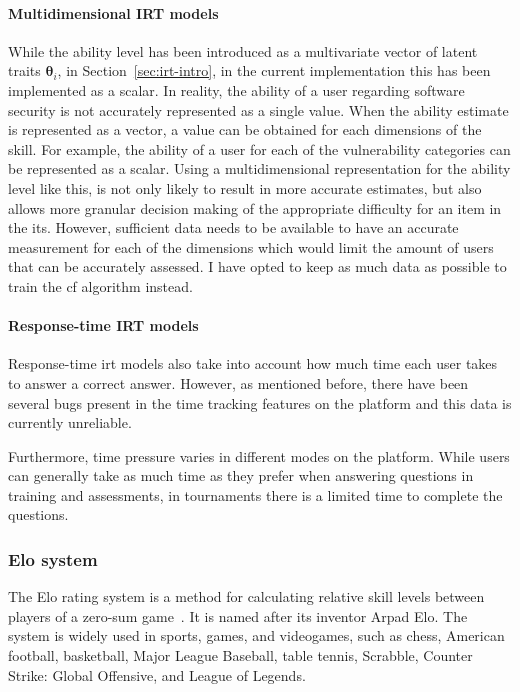 \paragraph{Multidimensional IRT models}
While the ability level has been introduced as a multivariate vector of latent traits $\bm{\theta}_i$, in Section~\ref{sec:irt-intro}, in the current implementation this has been implemented as a scalar.
In reality, the ability of a user regarding software security is not accurately represented as a single value.
When the ability estimate is represented as a vector, a value can be obtained for each dimensions of the skill.
For example, the ability of a user for each of the vulnerability categories can be represented as a scalar.
Using a multidimensional representation for the ability level like this, is not only likely to result in more accurate estimates, but also allows more granular decision making of the appropriate difficulty for an item in the \gls{its}.
However, sufficient data needs to be available to have an accurate measurement for each of the dimensions which would limit the amount of users that can be accurately assessed.
I have opted to keep as much data as possible to train the \gls{cf} algorithm instead.

\paragraph{Response-time IRT models}
Response-time \gls{irt} models also take into account how much time each user takes to answer a correct answer.
However, as mentioned before, there have been several bugs present in the time tracking features on the platform and this data is currently unreliable.

Furthermore, time pressure varies in different modes on the platform.
While users can generally take as much time as they prefer when answering questions in training and assessments, in tournaments there is a limited time to complete the questions.

\subsubsection{Elo system}
The Elo rating system is a method for calculating relative skill levels between players of a zero-sum game~\cite{elo1978rating}.
It is named after its inventor Arpad Elo.
The system is widely used in sports, games, and videogames, such as chess, American football, basketball, Major League Baseball, table tennis, Scrabble, Counter Strike: Global Offensive, and League of Legends.

